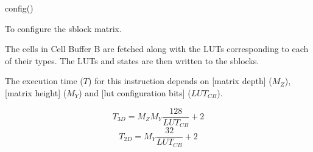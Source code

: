 

\format

config()

\purpose

To configure the sblock matrix.

\description

The cells in Cell Buffer B are fetched along with the LUTs corresponding to each of their types.
The LUTs and states are then written to the sblocks.

\notes

The execution time ($T$) for this instruction depends on [matrix depth] ($M_Z$), [matrix height] ($M_Y$) and [lut configuration bits] ($LUT_{CB}$).

$$ T_{3D} = M_Z M_Y \frac{ 128 }{ LUT_{CB} } + 2 $$
$$ T_{2D} = M_Y \frac{ 32 }{ LUT_{CB} } + 2 $$
